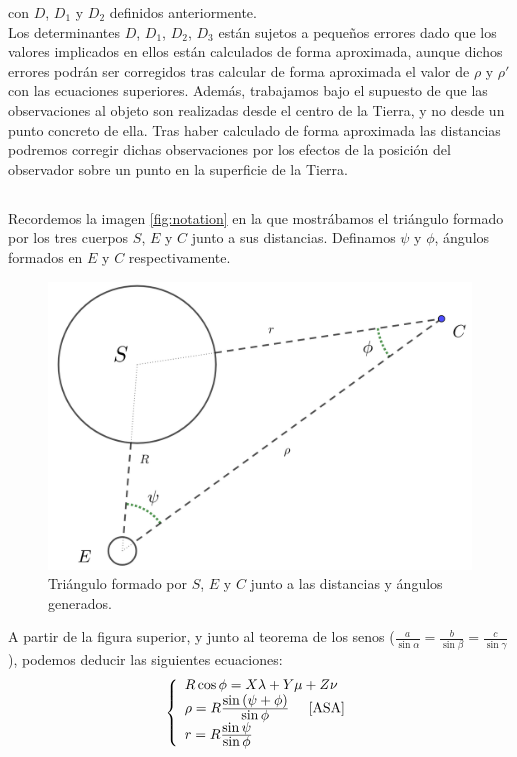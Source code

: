 \documentclass[11pt]{article}
\newcommand\ddfrac[2]{\frac{\displaystyle #1}{\displaystyle #2}}
\begin{document}
\noindent con $D$, $D_1$ y $D_2$ definidos anteriormente.\\

Los determinantes $D$, $D_1$, $D_2$, $D_3$ están sujetos a pequeños errores dado que los valores implicados en ellos están calculados de forma aproximada, aunque dichos errores podrán ser corregidos tras calcular de forma aproximada el valor de $\rho$ y $\rho'$ con las ecuaciones superiores. Además, trabajamos bajo el supuesto de que las observaciones al objeto son realizadas desde el centro de la Tierra, y no desde un punto concreto de ella. Tras haber calculado de forma aproximada las distancias podremos corregir dichas observaciones por los efectos de la posición del observador sobre un punto en la superficie de la Tierra.\\


\subsection{}
\label{subsec:distancias_r_rho}
Recordemos la imagen \ref{fig:notation} en la que mostrábamos el triángulo formado por los tres cuerpos $S$, $E$ y $C$ junto a sus distancias. Definamos $\psi$ y $\phi$, ángulos formados en $E$ y $C$ respectivamente.

\begin{figure}[H]
\centering
\includegraphics[scale=0.15]{images/notation_angles.png}
\caption{Triángulo formado por $S$, $E$ y $C$ junto a las distancias y ángulos generados.}
\label{fig:notation_angles}
\end{figure}

A partir de la figura superior, y junto al teorema de los senos ($\ddfrac{a}{\sin{\alpha}}=\ddfrac{b}{\sin{\beta}}=\ddfrac{c}{\sin{\gamma}}$), podemos deducir las siguientes ecuaciones:
\begin{align}
\left\{
\begin{array}{l}
	R\cos{\phi}=X\lambda+Y\mu+Z\nu\\
	\rho=R\ddfrac{\sin{(\psi+\phi)}}{\sin{\phi}}\; \; \; \; \; \cite{ASA}\\
	r=R\ddfrac{\sin{\psi}}{\sin{\phi}}
\end{array}
\right.
\label{eq:triangle_relations}
\end{align}
\end{document}
